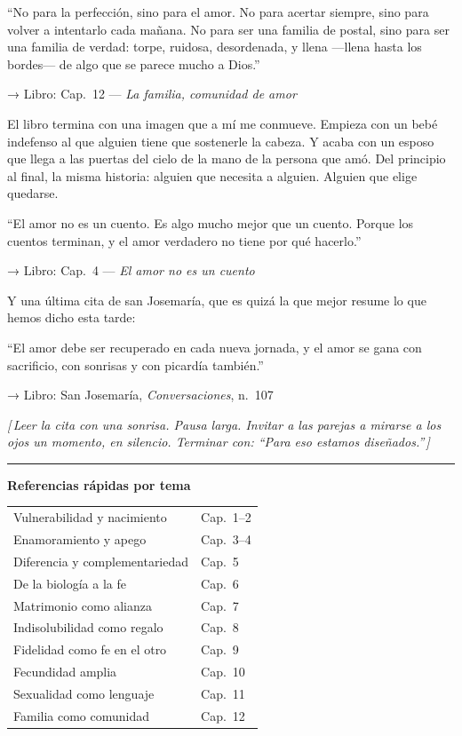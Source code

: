 \documentclass[a4paper, 11pt]{article}
\newcommand{\reflibro}[1]{%
  {\small\sffamily\color{gris} → Libro: #1}%
}
\newcommand{\nota}[1]{%
  \par\smallskip
  {\small\itshape\color{oro!80!black} [\,#1\,]}%
  \par\smallskip
}
\begin{document}
\begin{citalibro}
``No para la perfección, sino para el amor. No para acertar siempre, sino para volver a intentarlo cada mañana. No para ser una familia de postal, sino para ser una familia de verdad: torpe, ruidosa, desordenada, y llena ---llena hasta los bordes--- de algo que se parece mucho a Dios.''
\end{citalibro}
\reflibro{Cap.\ 12 — \emph{La familia, comunidad de amor}}

El libro termina con una imagen que a mí me conmueve. Empieza con un bebé indefenso al que alguien tiene que sostenerle la cabeza. Y acaba con un esposo que llega a las puertas del cielo de la mano de la persona que amó. Del principio al final, la misma historia: alguien que necesita a alguien. Alguien que elige quedarse.

\begin{citalibro}
``El amor no es un cuento. Es algo mucho mejor que un cuento. Porque los cuentos terminan, y el amor verdadero no tiene por qué hacerlo.''
\end{citalibro}
\reflibro{Cap.\ 4 — \emph{El amor no es un cuento}}

Y una última cita de san Josemaría, que es quizá la que mejor resume lo que hemos dicho esta tarde:

\begin{citalibro}
``El amor debe ser recuperado en cada nueva jornada, y el amor se gana con sacrificio, con sonrisas y con picardía también.''
\end{citalibro}
\reflibro{San Josemaría, \emph{Conversaciones}, n.~107}

\nota{Leer la cita con una sonrisa. Pausa larga. Invitar a las parejas a mirarse a los ojos un momento, en silencio. Terminar con: ``Para eso estamos diseñados.''}

\vspace{2em}
\noindent\rule{\textwidth}{0.4pt}
\vspace{0.5em}

\begin{center}
{\sffamily\small\color{gris}
\textbf{Referencias rápidas por tema}\\[6pt]
\begin{tabular}{ll}
Vulnerabilidad y nacimiento & Cap.\ 1--2 \\
Enamoramiento y apego & Cap.\ 3--4 \\
Diferencia y complementariedad & Cap.\ 5 \\
De la biología a la fe & Cap.\ 6 \\
Matrimonio como alianza & Cap.\ 7 \\
Indisolubilidad como regalo & Cap.\ 8 \\
Fidelidad como fe en el otro & Cap.\ 9 \\
Fecundidad amplia & Cap.\ 10 \\
Sexualidad como lenguaje & Cap.\ 11 \\
Familia como comunidad & Cap.\ 12 \\
\end{tabular}
}
\end{center}
\end{document}
